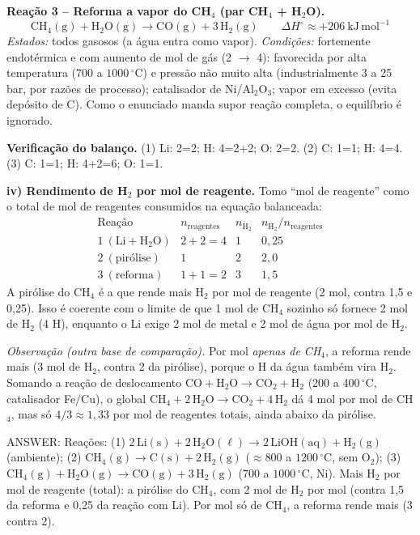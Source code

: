 \documentclass{article}%
\begin{document}
\medskip
\textbf{Reação 3 -- Reforma a vapor do CH$_4$ (par CH$_4$ + H$_2$O).}
\[
\mathrm{CH_4(g)} + \mathrm{H_2O(g)} \longrightarrow \mathrm{CO(g)} + 3\,\mathrm{H_2(g)} \qquad \Delta H^\circ\approx +206\ \mathrm{kJ\,mol^{-1}}
\]
\textit{Estados:} todos gasosos (a água entra como vapor).
\textit{Condições:} fortemente endotérmica e com aumento de mol de gás (2 $\to$ 4): favorecida por alta temperatura ($700$ a $1000\,^\circ$C) e pressão não muito alta (industrialmente 3 a 25 bar, por razões de processo); catalisador de Ni/Al$_2$O$_3$; vapor em excesso (evita depósito de C). Como o enunciado manda supor reação completa, o equilíbrio é ignorado.

\medskip
\textbf{Verificação do balanço.} (1) Li: 2=2; H: 4=2+2; O: 2=2. (2) C: 1=1; H: 4=4. (3) C: 1=1; H: 4+2=6; O: 1=1.

\medskip
\textbf{iv) Rendimento de H$_2$ por mol de reagente.} Tomo ``mol de reagente'' como o total de mol de reagentes consumidos na equação balanceada:
\[
\begin{array}{lccc}
\text{Reação} & n_{\text{reagentes}} & n_{\mathrm{H_2}} & n_{\mathrm{H_2}}/n_{\text{reagentes}}\\ \hline
1\ (\mathrm{Li+H_2O}) & 2+2=4 & 1 & 0{,}25\\
2\ (\text{pirólise}) & 1 & 2 & 2{,}0\\
3\ (\text{reforma}) & 1+1=2 & 3 & 1{,}5
\end{array}
\]
A pirólise do CH$_4$ é a que rende mais H$_2$ por mol de reagente (2 mol, contra 1,5 e 0,25). Isso é coerente com o limite de que 1 mol de CH$_4$ sozinho só fornece 2 mol de H$_2$ (4 H), enquanto o Li exige 2 mol de metal e 2 mol de água por mol de H$_2$.

\textit{Observação (outra base de comparação).} Por mol \emph{apenas de CH$_4$}, a reforma rende mais (3 mol de H$_2$, contra 2 da pirólise), porque o H da água também vira H$_2$. Somando a reação de deslocamento $\mathrm{CO+H_2O\to CO_2+H_2}$ (200 a 400\,$^\circ$C, catalisador Fe/Cu), o global $\mathrm{CH_4+2\,H_2O\to CO_2+4\,H_2}$ dá 4 mol por mol de CH$_4$, mas só $4/3\approx1{,}33$ por mol de reagentes totais, ainda abaixo da pirólise.

ANSWER: Reações: (1) $2\,\mathrm{Li(s)}+2\,\mathrm{H_2O(\ell)}\to2\,\mathrm{LiOH(aq)}+\mathrm{H_2(g)}$ (ambiente); (2) $\mathrm{CH_4(g)}\to\mathrm{C(s)}+2\,\mathrm{H_2(g)}$ ($\approx 800$ a $1200\,^\circ$C, sem O$_2$); (3) $\mathrm{CH_4(g)}+\mathrm{H_2O(g)}\to\mathrm{CO(g)}+3\,\mathrm{H_2(g)}$ ($700$ a $1000\,^\circ$C, Ni). Mais H$_2$ por mol de reagente (total): a pirólise do CH$_4$, com 2 mol de H$_2$ por mol (contra 1,5 da reforma e 0,25 da reação com Li). Por mol só de CH$_4$, a reforma rende mais (3 contra 2).%
\newpage%
\end{document}
